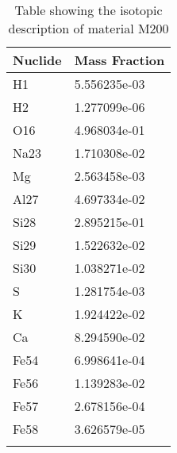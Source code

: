 \begin{centering}
\begin{longtable}[ht!]
\caption{Table showing the isotopic description of material UppDucts}
\label{table:material_UppDucts}
\end{longtable}\clearpage

\begin{longtable}[ht!]
{ p{} | p{} }
\hline
Nuclide & Mass Fraction\\
\hline
H1 & 5.556235e-03\\
H2 & 1.277099e-06\\
O16 & 4.968034e-01\\
Na23 & 1.710308e-02\\
Mg & 2.563458e-03\\
Al27 & 4.697334e-02\\
Si28 & 2.895215e-01\\
Si29 & 1.522632e-02\\
Si30 & 1.038271e-02\\
S & 1.281754e-03\\
K & 1.924422e-02\\
Ca & 8.294590e-02\\
Fe54 & 6.998641e-04\\
Fe56 & 1.139283e-02\\
Fe57 & 2.678156e-04\\
Fe58 & 3.626579e-05\\

\caption{Table showing the isotopic description of material M200}
\label{table:material_M200}
\end{longtable}\clearpage


\end{centering}
